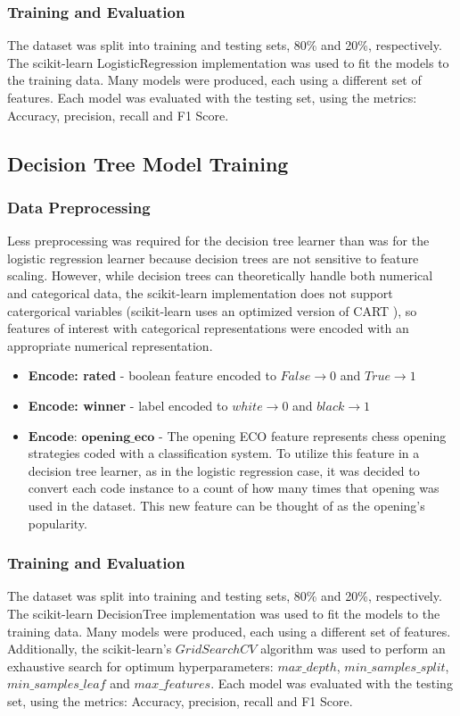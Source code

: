 \documentclass[12pt]{article}
\begin{document}
\subsubsection{Training and Evaluation}

The dataset was split into training and testing sets, 80\% and 20\%, respectively. The scikit-learn LogisticRegression implementation was used to fit the models to the training data. Many models were produced, each using a different set of features. Each model was evaluated with the testing set, using the metrics: Accuracy, precision, recall and F1 Score.

\subsection{Decision Tree Model Training}

\subsubsection{Data Preprocessing}
Less preprocessing was required for the decision tree learner than was for the logistic regression learner because decision trees are not sensitive to feature scaling. However, while decision trees can theoretically handle both numerical and categorical data, the scikit-learn implementation does not support catergorical variables \cite{sklearnDT} (scikit-learn uses an optimized version of CART \cite{classificationTrees1984}), so features of interest with categorical representations were encoded with an appropriate numerical representation.

\begin{itemize}[label={}, leftmargin=0pt]
  \item \textbf{Encode: rated} - boolean feature encoded to $False \rightarrow 0$ and $True \rightarrow 1$
  \item \textbf{Encode: winner} - label encoded to $white \rightarrow 0$ and $black \rightarrow 1$
  \item $\textbf{Encode: opening\_eco}$ - The opening ECO feature represents chess opening strategies coded with a classification system. To utilize this feature in a decision tree learner, as in the logistic regression case, it was decided to convert each code instance to a count of how many times that opening was used in the dataset. This new feature can be thought of as the opening's popularity. 
\end{itemize}

\subsubsection{Training and Evaluation}
The dataset was split into training and testing sets, 80\% and 20\%, respectively. The scikit-learn DecisionTree implementation was used to fit the models to the training data. Many models were produced, each using a different set of features. Additionally, the scikit-learn's $GridSearchCV$ \cite{sklearnGSCV} algorithm was used to perform an exhaustive search for optimum hyperparameters: $max\_depth$, $min\_samples\_split$, $min\_samples\_leaf$ and $max\_features$. Each model was evaluated with the testing set, using the metrics: Accuracy, precision, recall and F1 Score.
\end{document}
